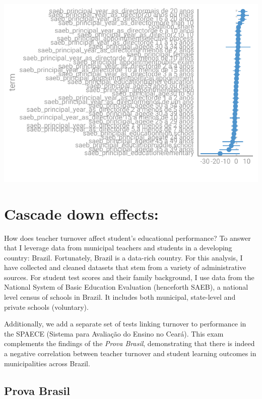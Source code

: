 \documentclass[12pt,]{article}
\begin{document}
\begin{center}\includegraphics{dissertation_files/figure-latex/graphs-2} \end{center}

\hypertarget{cascade-down-effects}{%
\section{Cascade down effects:}\label{cascade-down-effects}}

How does teacher turnover affect student's educational performance? To
answer that I leverage data from municipal teachers and students in a
developing country: Brazil. Fortunately, Brazil is a data-rich country.
For this analysis, I have collected and cleaned datasets that stem from
a variety of administrative sources. For student test scores and their
family background, I use data from the National System of Basic
Education Evaluation (henceforth SAEB), a national level census of
schools in Brazil. It includes both municipal, state-level and private
schools (voluntary).

Additionally, we add a separate set of tests linking turnover to
performance in the SPAECE (Sistema para Avaliação do Ensino no Ceará).
This exam complements the findings of the \textit{Prova Brasil},
demonstrating that there is indeed a negative correlation between
teacher turnover and student learning outcomes in municipalities across
Brazil.

\hypertarget{prova-brasil}{%
\subsection{Prova Brasil}\label{prova-brasil}}
\end{document}

